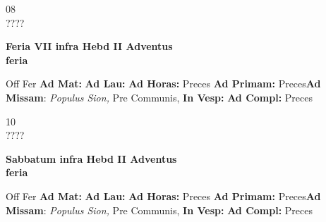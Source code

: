 \documentclass[10pt, openany]{book}
\begin{document}
    \begin{center}
        \begin{minipage}{3.5in}
            \vspace{2em}
            \begin{minipage}{0.5in}
                {\Huge 08} \\
                {\normalsize ????}
            \end{minipage}
            \begin{minipage}{3.0in}
                \textbf{ \large Feria VII infra Hebd II Adventus \\
                \textnormal{\normalsize feria}}

            \end{minipage}
            \begin{justify}Off Fer
                \textbf{Ad Mat: }
                \textbf{Ad Lau: }
                \textbf{Ad Horas: }Preces
                \textbf{Ad Primam: }Preces\textbf{Ad Missam}: \textit{Populus Sion,} Pre Communis, 
                \textbf{In Vesp: }
                \textbf{Ad Compl: }Preces
            \end{justify}
        \end{minipage}
    \end{center}

    \begin{center}
        \begin{minipage}{3.5in}
            \vspace{2em}
            \begin{minipage}{0.5in}
                {\Huge 10} \\
                {\normalsize ????}
            \end{minipage}
            \begin{minipage}{3.0in}
                \textbf{ \large Sabbatum infra Hebd II Adventus \\
                \textnormal{\normalsize feria}}

            \end{minipage}
            \begin{justify}Off Fer
                \textbf{Ad Mat: }
                \textbf{Ad Lau: }
                \textbf{Ad Horas: }Preces
                \textbf{Ad Primam: }Preces\textbf{Ad Missam}: \textit{Populus Sion,} Pre Communis, 
                \textbf{In Vesp: }
                \textbf{Ad Compl: }Preces
            \end{justify}
        \end{minipage}
    \end{center}
\end{document}

